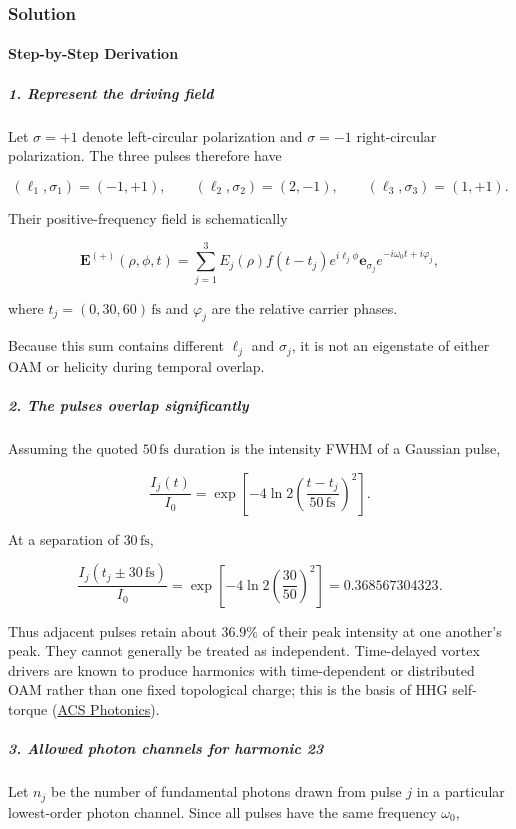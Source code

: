 \subsubsection*{Solution}
\paragraph*{Step-by-Step Derivation}

\subparagraph*{1. Represent the driving field}

Let $\sigma=+1$ denote left-circular polarization and $\sigma=-1$ right-circular polarization. The three pulses therefore have

\[
(\ell_1,\sigma_1)=(-1,+1),\qquad (\ell_2,\sigma_2)=(2,-1),\qquad (\ell_3,\sigma_3)=(1,+1).
\]

Their positive-frequency field is schematically

\[
\mathbf E^{(+)}(\rho,\phi,t) = \sum_{j=1}^{3} E_j(\rho)f(t-t_j) e^{i\ell_j\phi} \mathbf e_{\sigma_j} e^{-i\omega_0t+i\varphi_j},
\]

where $t_j=(0,30,60)\,\mathrm{fs}$ and $\varphi_j$ are the relative carrier phases.

Because this sum contains different $\ell_j$ and $\sigma_j$, it is not an eigenstate of either OAM or helicity during temporal overlap.

\subparagraph*{2. The pulses overlap significantly}

Assuming the quoted $50\,\mathrm{fs}$ duration is the intensity FWHM of a Gaussian pulse,

\[
\frac{I_j(t)}{I_0} = \exp\left[ -4\ln 2\left(\frac{t-t_j}{50\,\mathrm{fs}}\right)^2 \right].
\]

At a separation of $30\,\mathrm{fs}$,

\[
\frac{I_j(t_j\pm30\,\mathrm{fs})}{I_0} = \exp\left[-4\ln2\left(\frac{30}{50}\right)^2\right] = 0.368567304323.
\]

Thus adjacent pulses retain about $36.9\%$ of their peak intensity at one another's peak. They cannot generally be treated as independent. Time-delayed vortex drivers are known to produce harmonics with time-dependent or distributed OAM rather than one fixed topological charge; this is the basis of HHG self-torque (\href{\detokenize{https://pubs.acs.org/doi/10.1021/acsphotonics.4c01320}}{ACS Photonics}).

\subparagraph*{3. Allowed photon channels for harmonic 23}

Let $n_j$ be the number of fundamental photons drawn from pulse $j$ in a particular lowest-order photon channel. Since all pulses have the same frequency $\omega_0$,

